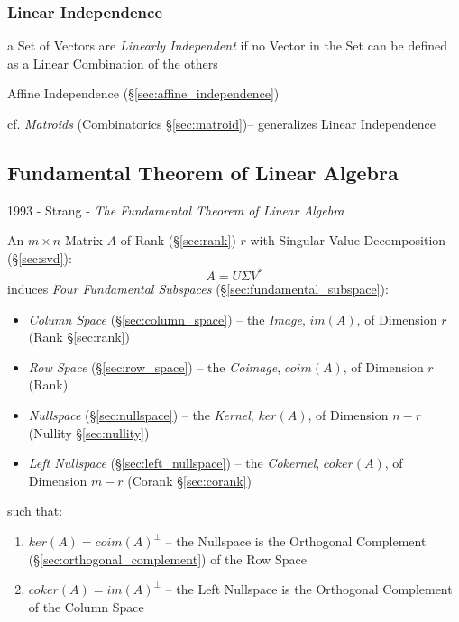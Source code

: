 \subsubsection{Linear Independence}\label{sec:linear_independence}

a Set of Vectors are \emph{Linearly Independent} if no Vector in the Set can be
defined as a Linear Combination of the others

\fist Affine Independence (\S\ref{sec:affine_independence})

\fist cf. \emph{Matroids} (Combinatorics \S\ref{sec:matroid})-- generalizes
Linear Independence



\subsection{Fundamental Theorem of Linear Algebra}
\label{sec:fundamental_linear_algebra_theorem}

1993 - Strang - \emph{The Fundamental Theorem of Linear Algebra}

An $m \times n$ Matrix $A$ of Rank (\S\ref{sec:rank}) $r$ with Singular
Value Decomposition (\S\ref{sec:svd}):
\[
  A = U \Sigma V^*
\]
induces \emph{Four Fundamental Subspaces} (\S\ref{sec:fundamental_subspace}):
\begin{itemize}
  \item \emph{Column Space} (\S\ref{sec:column_space}) -- the \emph{Image},
    $im(A)$, of Dimension $r$ (Rank \S\ref{sec:rank})
  \item \emph{Row Space} (\S\ref{sec:row_space}) -- the \emph{Coimage},
    $coim(A)$, of Dimension $r$ (Rank)
  \item \emph{Nullspace} (\S\ref{sec:nullspace}) -- the \emph{Kernel},
    $ker(A)$, of Dimension $n - r$ (Nullity \S\ref{sec:nullity})
  \item \emph{Left Nullspace} (\S\ref{sec:left_nullspace}) -- the
    \emph{Cokernel}, $coker(A)$, of Dimension $m - r$ (Corank
    \S\ref{sec:corank})
\end{itemize}
such that:
\begin{enumerate}
  \item $ker(A) = coim(A)^\bot$ -- the Nullspace is the Orthogonal Complement
    (\S\ref{sec:orthogonal_complement}) of the Row Space
  \item $coker(A) = im(A)^\bot$ -- the Left Nullspace is the Orthogonal
    Complement of the Column Space
\end{enumerate}



